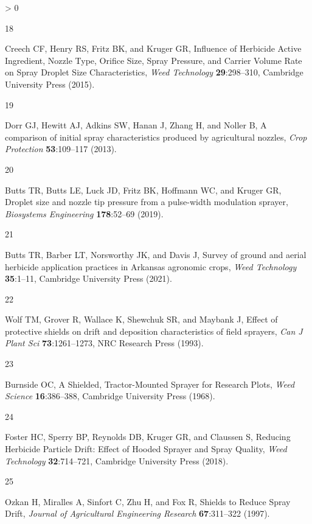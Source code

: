 \documentclass[
  12pt,
  a4paper,
]{article}
\newlength{\cslhangindent}
\newlength{\csllabelwidth}
\newenvironment{CSLReferences}[2] %
 {%
  \setlength{\parindent}{0pt}
  \ifodd #1 \everypar{\setlength{\hangindent}{\cslhangindent}}\ignorespaces\fi
  \ifnum #2 > 0
  \setlength{\parskip}{#2\baselineskip}
  \fi
 }%
 {}
\newcommand{\CSLLeftMargin}[1]{\parbox[t]{\csllabelwidth}{#1}}
\newcommand{\CSLRightInline}[1]{\parbox[t]{\linewidth - \csllabelwidth}{#1}\break}
\begin{document}
\begin{CSLReferences}{1}{0}
\leavevmode\hypertarget{ref-creech2015}{}%
\CSLLeftMargin{18 }
\CSLRightInline{Creech CF, Henry RS, Fritz BK, and Kruger GR, Influence
of {Herbicide Active Ingredient}, {Nozzle Type}, {Orifice Size}, {Spray
Pressure}, and {Carrier Volume Rate} on {Spray Droplet Size
Characteristics}, \emph{Weed Technology} \textbf{29}:298--310,
{Cambridge University Press} (2015).}

\leavevmode\hypertarget{ref-dorr2013}{}%
\CSLLeftMargin{19 }
\CSLRightInline{Dorr GJ, Hewitt AJ, Adkins SW, Hanan J, Zhang H, and
Noller B, A comparison of initial spray characteristics produced by
agricultural nozzles, \emph{Crop Protection} \textbf{53}:109--117
(2013).}

\leavevmode\hypertarget{ref-butts2019}{}%
\CSLLeftMargin{20 }
\CSLRightInline{Butts TR, Butts LE, Luck JD, Fritz BK, Hoffmann WC, and
Kruger GR, Droplet size and nozzle tip pressure from a pulse-width
modulation sprayer, \emph{Biosystems Engineering} \textbf{178}:52--69
(2019).}

\leavevmode\hypertarget{ref-butts2021}{}%
\CSLLeftMargin{21 }
\CSLRightInline{Butts TR, Barber LT, Norsworthy JK, and Davis J, Survey
of ground and aerial herbicide application practices in {Arkansas}
agronomic crops, \emph{Weed Technology} \textbf{35}:1--11, {Cambridge
University Press} (2021).}

\leavevmode\hypertarget{ref-wolf1993}{}%
\CSLLeftMargin{22 }
\CSLRightInline{Wolf TM, Grover R, Wallace K, Shewchuk SR, and Maybank
J, Effect of protective shields on drift and deposition characteristics
of field sprayers, \emph{Can J Plant Sci} \textbf{73}:1261--1273, {NRC
Research Press} (1993).}

\leavevmode\hypertarget{ref-burnside1968}{}%
\CSLLeftMargin{23 }
\CSLRightInline{Burnside OC, A {Shielded}, {Tractor}-{Mounted Sprayer}
for {Research Plots}, \emph{Weed Science} \textbf{16}:386--388,
{Cambridge University Press} (1968).}

\leavevmode\hypertarget{ref-foster2018}{}%
\CSLLeftMargin{24 }
\CSLRightInline{Foster HC, Sperry BP, Reynolds DB, Kruger GR, and
Claussen S, Reducing {Herbicide Particle Drift}: {Effect} of {Hooded
Sprayer} and {Spray Quality}, \emph{Weed Technology}
\textbf{32}:714--721, {Cambridge University Press} (2018).}

\leavevmode\hypertarget{ref-ozkan1997}{}%
\CSLLeftMargin{25 }
\CSLRightInline{Ozkan H, Miralles A, Sinfort C, Zhu H, and Fox R,
Shields to {Reduce Spray Drift}, \emph{Journal of Agricultural
Engineering Research} \textbf{67}:311--322 (1997).}


\end{CSLReferences}
\end{document}
